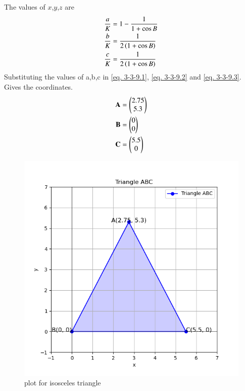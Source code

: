 \documentclass[journal]{IEEEtran}
\begin{document}
The values of $x$,$y$,$z$ are
\begin{align}
\frac{a}{K} &= 1 - \frac{1}{1+\cos B}\label{eq. 3-3-9.4}\\
\frac{b}{K} &= \frac{1}{2\left(1 + \cos B\right)}\label{eq. 3-3-9.5}\\
\frac{c}{K} &= \frac{1}{2\left(1 + \cos B\right)}\label{eq. 3-3-9.6}
\end{align}
Substituting  the values of a,b,c in \ref{eq. 3-3-9.1}, \ref{eq. 3-3-9.2} and \ref{eq. 3-3-9.3}. Gives the coordinates. 
\begin{align*}
     \textbf{A}&=\begin{pmatrix}2.75\\5.3\end{pmatrix}\\
     \textbf{B}&=\begin{pmatrix}0\\0\end{pmatrix}\\
     \textbf{C}&=\begin{pmatrix}5.5\\0\end{pmatrix}
\end{align*}


\begin{figure}[h!]
\centering
\includegraphics[width=0.7\columnwidth]{figs/Figure_1.png}
\caption{plot for isosceles triangle}
 \label{fig. 3-3-9-1}
\end{figure}
\end{document}
